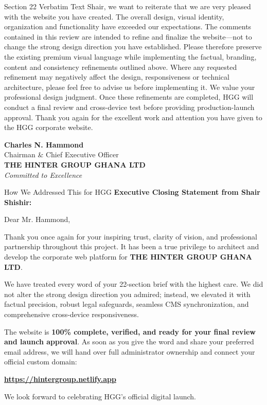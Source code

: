 \documentclass[11pt,a4paper]{article}
\begin{document}
\begin{VerbatimClientBox}{Section 22 Verbatim Text}
Shair, we want to reiterate that we are very pleased with the website you have created.
The overall design, visual identity, organization and functionality have exceeded our expectations.
The comments contained in this review are intended to refine and finalize the website---not to change the strong design direction you have established.
Please therefore preserve the existing premium visual language while implementing the factual, branding, content and consistency refinements outlined above.
Where any requested refinement may negatively affect the design, responsiveness or technical architecture, please feel free to advise us before implementing it. We value your professional design judgment.
Once these refinements are completed, HGG will conduct a final review and cross-device test before providing production-launch approval.
Thank you again for the excellent work and attention you have given to the HGG corporate website.

\textbf{Charles N. Hammond} \\
Chairman \& Chief Executive Officer \\
\textbf{THE HINTER GROUP GHANA LTD} \\
\textit{Committed to Excellence}
\end{VerbatimClientBox}

\begin{DetailedResolutionBox}{How We Addressed This for HGG}
\textbf{Executive Closing Statement from Shair Shishir:}

Dear Mr. Hammond,

Thank you once again for your inspiring trust, clarity of vision, and professional partnership throughout this project. It has been a true privilege to architect and develop the corporate web platform for \textbf{THE HINTER GROUP GHANA LTD}.

We have treated every word of your 22-section brief with the highest care. We did not alter the strong design direction you admired; instead, we elevated it with factual precision, robust legal safeguards, seamless CMS synchronization, and comprehensive cross-device responsiveness.

The website is \textbf{100\% complete, verified, and ready for your final review and launch approval}. As soon as you give the word and share your preferred email address, we will hand over full administrator ownership and connect your official custom domain:
\begin{center}
\large\bfseries\color{HGGAccentBlue}\url{https://hintergroup.netlify.app}
\end{center}
We look forward to celebrating HGG's official digital launch.
\end{DetailedResolutionBox}
\end{document}
